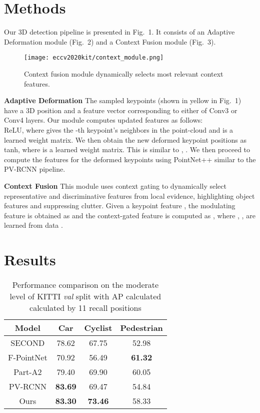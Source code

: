 \documentclass[runningheads]{llncs}
\begin{document}
\section{Methods}
Our 3D detection pipeline is presented in Fig.~1. It consists of an Adaptive Deformation module (Fig.~2) and a Context Fusion module (Fig.~3).
\begin{figure}[b]
\centering
\texttt{[image: eccv2020kit/context\_module.png]}
\caption{Context fusion module dynamically selects most relevant context features.}
\label{fig:context}
\end{figure}

\textbf{Adaptive Deformation} The  sampled keypoints (shown in yellow in Fig.~1) have a 3D position  and a feature vector  corresponding to either of Conv3 or Conv4 layers. Our module computes updated features  as follows: \\
ReLU, where  gives the -th keypoint's neighbors in the point-cloud and  is a learned weight matrix. We then obtain the new deformed keypoint positions as tanh, where  is a learned weight matrix. This is similar to \cite{MeshRCNN}, \cite{Pointdan}. We then proceed to compute the features for the deformed keypoints using PointNet++ similar to the PV-RCNN pipeline.

\textbf{Context Fusion}
This module uses context gating to dynamically select representative and discriminative features from local evidence, highlighting object features and suppressing clutter. Given a keypoint feature , the modulating feature is obtained as  and the context-gated feature is computed as , where , ,  are learned from data \cite{GLU}.

\section{Results}
\setlength{\tabcolsep}{4pt}
\begin{table}[t]
\begin{center}
\caption{Performance comparison on the moderate level of KITTI \textit{val} split with AP calculated calculated by 11 recall positions}
\label{table:headings}
\begin{tabular}{c||ccc}
\hline
Model & Car & Cyclist & Pedestrian\\
\hline
SECOND \cite{SECOND}  & 78.62 & 67.75 & 52.98 \\
F-PointNet \cite{FrustrumPointnet} & 70.92 & 56.49 & \bf{61.32} \\
Part-A2 \cite{PartA2}  & 79.40 & 69.90 & 60.05 \\
PV-RCNN \cite{PVRCNN} & \bf{83.69} & 69.47 & 54.84 \\
Ours  & \bf{83.30} & \bf{73.46} & 58.33 \\
\hline
\end{tabular}
\end{center}
\end{table}
\setlength{\tabcolsep}{1.4pt}
\end{document}
